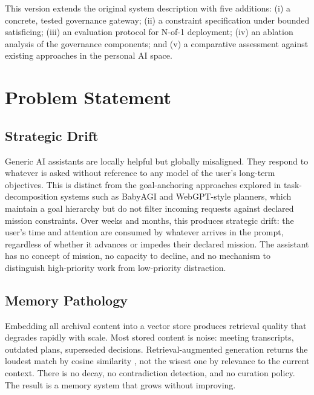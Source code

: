 \documentclass[11pt,a4paper]{article}
\begin{document}
This version extends the original system description with five additions: (i) a concrete, tested governance gateway; (ii) a constraint specification under bounded satisficing; (iii) an evaluation protocol for N-of-1 deployment; (iv) an ablation analysis of the governance components; and (v) a comparative assessment against existing approaches in the personal AI space.

\section{Problem Statement}

\subsection{Strategic Drift}

Generic AI assistants are locally helpful but globally misaligned. They respond to whatever is asked without reference to any model of the user's long-term objectives. This is distinct from the goal-anchoring approaches explored in task-decomposition systems such as BabyAGI and WebGPT-style planners, which maintain a goal hierarchy but do not filter incoming requests against declared mission constraints. Over weeks and months, this produces strategic drift: the user's time and attention are consumed by whatever arrives in the prompt, regardless of whether it advances or impedes their declared mission. The assistant has no concept of mission, no capacity to decline, and no mechanism to distinguish high-priority work from low-priority distraction.

\subsection{Memory Pathology}

Embedding all archival content into a vector store produces retrieval quality that degrades rapidly with scale. Most stored content is noise: meeting transcripts, outdated plans, superseded decisions. Retrieval-augmented generation returns the loudest match by cosine similarity \citep{liu2023lost}, not the wisest one by relevance to the current context. There is no decay, no contradiction detection, and no curation policy. The result is a memory system that grows without improving.
\end{document}
